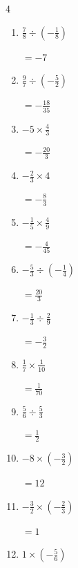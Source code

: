 \begin{multicols}{4}
\begin{enumerate}
        $\displaystyle =-\frac{30}{7}$

  \item $\displaystyle \frac{7}{8}\div{}\left(-\frac{1}{8}\right)$

        $\displaystyle =-7$

  \item $\displaystyle \frac{9}{7}\div{}\left(-\frac{5}{2}\right)$

        $\displaystyle =-\frac{18}{35}$

  \item $\displaystyle -5\times{}\frac{4}{3}$

        $\displaystyle =-\frac{20}{3}$

  \item $\displaystyle -\frac{2}{3}\times{}4$

        $\displaystyle =-\frac{8}{3}$

  \item $\displaystyle -\frac{1}{5}\times{}\frac{4}{9}$

        $\displaystyle =-\frac{4}{45}$

  \item $\displaystyle -\frac{5}{3}\div{}\left(-\frac{1}{4}\right)$

        $\displaystyle =\frac{20}{3}$

  \item $\displaystyle -\frac{1}{3}\div{}\frac{2}{9}$

        $\displaystyle =-\frac{3}{2}$

  \item $\displaystyle \frac{1}{7}\times{}\frac{1}{10}$

        $\displaystyle =\frac{1}{70}$

\columnbreak %

  \item $\displaystyle \frac{5}{6}\div{}\frac{5}{3}$

        $\displaystyle =\frac{1}{2}$

  \item $\displaystyle -8\times{}\left(-\frac{3}{2}\right)$

        $\displaystyle =12$

  \item $\displaystyle -\frac{3}{2}\times{}\left(-\frac{2}{3}\right)$

        $\displaystyle =1$

  \item $\displaystyle 1\times{}\left(-\frac{5}{6}\right)$


\end{enumerate}
\end{multicols}
